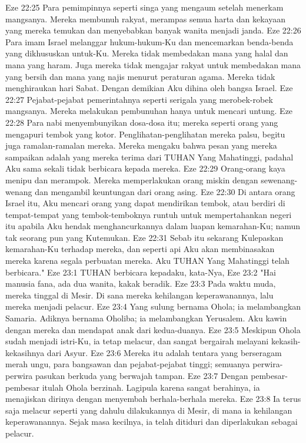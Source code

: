 Eze 22:25  Para pemimpinnya seperti singa yang mengaum setelah menerkam mangsanya. Mereka membunuh rakyat, merampas semua harta dan kekayaan yang mereka temukan dan menyebabkan banyak wanita menjadi janda.
Eze 22:26  Para imam Israel melanggar hukum-hukum-Ku dan mencemarkan benda-benda yang dikhususkan untuk-Ku. Mereka tidak membedakan mana yang halal dan mana yang haram. Juga mereka tidak mengajar rakyat untuk membedakan mana yang bersih dan mana yang najis menurut peraturan agama. Mereka tidak menghiraukan hari Sabat. Dengan demikian Aku dihina oleh bangsa Israel.
Eze 22:27  Pejabat-pejabat pemerintahnya seperti serigala yang merobek-robek mangsanya. Mereka melakukan pembunuhan hanya untuk mencari untung.
Eze 22:28  Para nabi menyembunyikan dosa-dosa itu; mereka seperti orang yang mengapuri tembok yang kotor. Penglihatan-penglihatan mereka palsu, begitu juga ramalan-ramalan mereka. Mereka mengaku bahwa pesan yang mereka sampaikan adalah yang mereka terima dari TUHAN Yang Mahatinggi, padahal Aku sama sekali tidak berbicara kepada mereka.
Eze 22:29  Orang-orang kaya menipu dan merampok. Mereka memperlakukan orang miskin dengan sewenang-wenang dan mengambil keuntungan dari orang asing.
Eze 22:30  Di antara orang Israel itu, Aku mencari orang yang dapat mendirikan tembok, atau berdiri di tempat-tempat yang tembok-temboknya runtuh untuk mempertahankan negeri itu apabila Aku hendak menghancurkannya dalam luapan kemarahan-Ku; namun tak seorang pun yang Kutemukan.
Eze 22:31  Sebab itu sekarang Kulepaskan kemarahan-Ku terhadap mereka, dan seperti api Aku akan membinasakan mereka karena segala perbuatan mereka. Aku TUHAN Yang Mahatinggi telah berbicara."
Eze 23:1  TUHAN berbicara kepadaku, kata-Nya,
Eze 23:2  "Hai manusia fana, ada dua wanita, kakak beradik.
Eze 23:3  Pada waktu muda, mereka tinggal di Mesir. Di sana mereka kehilangan keperawanannya, lalu mereka menjadi pelacur.
Eze 23:4  Yang sulung bernama Ohola; ia melambangkan Samaria. Adiknya bernama Oholiba; ia melambangkan Yerusalem. Aku kawin dengan mereka dan mendapat anak dari kedua-duanya.
Eze 23:5  Meskipun Ohola sudah menjadi istri-Ku, ia tetap melacur, dan sangat bergairah melayani kekasih-kekasihnya dari Asyur.
Eze 23:6  Mereka itu adalah tentara yang berseragam merah ungu, para bangsawan dan pejabat-pejabat tinggi; semuanya perwira-perwira pasukan berkuda yang berwajah tampan.
Eze 23:7  Dengan pembesar-pembesar itulah Ohola berzinah. Lagipula karena sangat berahinya, ia menajiskan dirinya dengan menyembah berhala-berhala mereka.
Eze 23:8  Ia terus saja melacur seperti yang dahulu dilakukannya di Mesir, di mana ia kehilangan keperawanannya. Sejak masa kecilnya, ia telah ditiduri dan diperlakukan sebagai pelacur.
